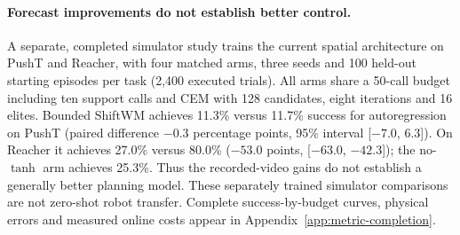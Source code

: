 \paragraph{Forecast improvements do not establish better control.}
A separate, completed simulator study trains the current spatial architecture
on PushT and Reacher, with four matched arms, three seeds and 100 held-out
starting episodes per task (2,400 executed trials). All arms share a 50-call
budget including ten support calls and CEM with 128 candidates, eight iterations
and 16 elites. Bounded ShiftWM achieves 11.3\% versus 11.7\% success for
autoregression on PushT (paired difference $-0.3$ percentage points,
95\% interval [$-7.0$, $6.3$]). On Reacher it achieves 27.0\% versus 80.0\%
($-53.0$ points, [$-63.0$, $-42.3$]); the no-$\tanh$ arm achieves 25.3\%.
Thus the recorded-video gains do not establish a generally better planning
model. These separately trained simulator comparisons are not zero-shot robot
transfer. Complete success-by-budget curves, physical errors and measured
online costs appear in Appendix~\ref{app:metric-completion}.
